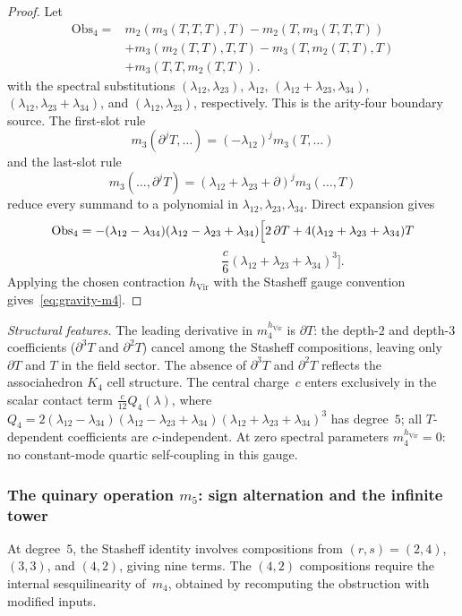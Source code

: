 \begin{proof}
Let
\[
\begin{aligned}
\mathrm{Obs}_4={}&m_2(m_3(T,T,T),T)-m_2(T,m_3(T,T,T))\\
&+m_3(m_2(T,T),T,T)-m_3(T,m_2(T,T),T)\\
&+m_3(T,T,m_2(T,T)).
\end{aligned}
\]
with the spectral substitutions
\((\lambda_{12},\lambda_{23})\), \(\lambda_{12}\),
\((\lambda_{12}+\lambda_{23},\lambda_{34})\),
\((\lambda_{12},\lambda_{23}+\lambda_{34})\), and
\((\lambda_{12},\lambda_{23})\), respectively.  This is the
arity-four boundary source.  The first-slot rule
\[
m_3(\partial^j T,\ldots)=(-\lambda_{12})^j m_3(T,\ldots)
\]
and the last-slot rule
\[
m_3(\ldots,\partial^jT)
=(\lambda_{12}+\lambda_{23}+\partial)^j m_3(\ldots,T)
\]
reduce every summand to a polynomial in
\(\lambda_{12},\lambda_{23},\lambda_{34}\).  Direct expansion gives
\[
\mathrm{Obs}_4
=-(\lambda_{12}-\lambda_{34})
  (\lambda_{12}-\lambda_{23}+\lambda_{34})
\Bigl[
2\,\partial T+
4(\lambda_{12}+\lambda_{23}+\lambda_{34})T
\]
\[
\hspace{8em}
\frac{c}{6}(\lambda_{12}+\lambda_{23}+\lambda_{34})^3
\Bigr].
\]
Applying the chosen contraction \(h_{\mathrm{Vir}}\) with the Stasheff
gauge convention gives~\eqref{eq:gravity-m4}.
\end{proof}

\noindent
\textit{Structural features.}
The leading derivative in \(m_4^{h_{\mathrm{Vir}}}\) is $\partial T$: the depth-$2$ and
depth-$3$ coefficients ($\partial^3 T$ and $\partial^2 T$) cancel
among the Stasheff compositions, leaving only $\partial T$ and $T$ in
the field sector. The absence of $\partial^3 T$ and $\partial^2 T$
reflects the associahedron $K_4$ cell structure.
The central charge~$c$ enters exclusively in the scalar
contact term $\frac{c}{12}Q_4(\lambda)$, where $Q_4 =
2(\lambda_{12}-\lambda_{34})(\lambda_{12}-\lambda_{23}+\lambda_{34})
(\lambda_{12}+\lambda_{23}+\lambda_{34})^3$ has degree~$5$;
all $T$-dependent coefficients are $c$-independent.
At zero spectral parameters \(m_4^{h_{\mathrm{Vir}}}=0\): no
constant-mode quartic self-coupling in this gauge.

\subsubsection*{The quinary operation $m_5$: sign alternation and
 the infinite tower}

At degree~$5$, the Stasheff identity involves compositions from
$(r,s) = (2,4)$, $(3,3)$, and $(4,2)$, giving nine terms.
The $(4,2)$ compositions require the internal sesquilinearity
of~$m_4$, obtained by recomputing the obstruction with modified inputs.

